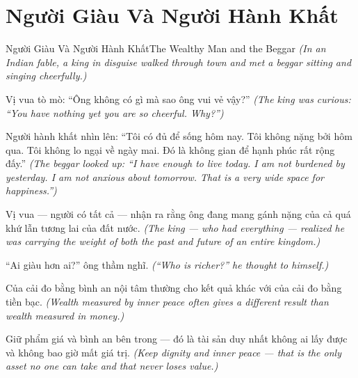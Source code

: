 \section{Người Giàu Và Người Hành Khất}
\begin{truyen}{Người Giàu Và Người Hành Khất}{The Wealthy Man and the Beggar}
\textit{(In an Indian fable, a king in disguise walked through town and met a beggar sitting and singing cheerfully.)}

Vị vua tò mò: ``Ông không có gì mà sao ông vui vẻ vậy?''
\textit{(The king was curious: ``You have nothing yet you are so cheerful. Why?'')}

Người hành khất nhìn lên: ``Tôi có đủ để sống hôm nay. Tôi không nặng bởi hôm qua. Tôi không lo ngại về ngày mai. Đó là không gian để hạnh phúc rất rộng đấy.''
\textit{(The beggar looked up: ``I have enough to live today. I am not burdened by yesterday. I am not anxious about tomorrow. That is a very wide space for happiness.'')}

Vị vua — người có tất cả — nhận ra rằng ông đang mang gánh nặng của cả quá khứ lẫn tương lai của đất nước.
\textit{(The king — who had everything — realized he was carrying the weight of both the past and future of an entire kingdom.)}

``Ai giàu hơn ai?'' ông thầm nghĩ.
\textit{(``Who is richer?'' he thought to himself.)}

Của cải đo bằng bình an nội tâm thường cho kết quả khác với của cải đo bằng tiền bạc.
\textit{(Wealth measured by inner peace often gives a different result than wealth measured in money.)}

\end{truyen}

\begin{baihoc}
Giữ phẩm giá và bình an bên trong — đó là tài sản duy nhất không ai lấy được và không bao giờ mất giá trị.
\textit{(Keep dignity and inner peace — that is the only asset no one can take and that never loses value.)}
\end{baihoc}
\ngancach

